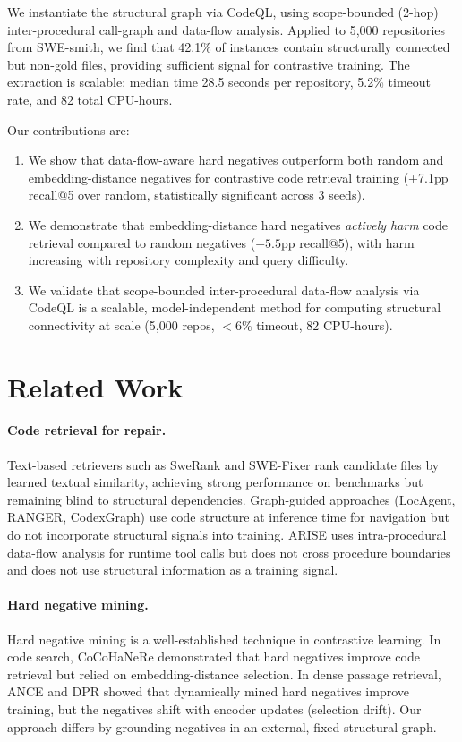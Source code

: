 \documentclass[11pt]{article}
\begin{document}
We instantiate the structural graph via CodeQL, using scope-bounded (2-hop) inter-procedural call-graph and data-flow analysis.
Applied to 5{,}000 repositories from SWE-smith, we find that 42.1\% of instances contain structurally connected but non-gold files, providing sufficient signal for contrastive training.
The extraction is scalable: median time 28.5 seconds per repository, 5.2\% timeout rate, and 82 total CPU-hours.

Our contributions are:
\begin{enumerate}[nosep]
  \item We show that data-flow-aware hard negatives outperform both random and embedding-distance negatives for contrastive code retrieval training (+7.1pp recall@5 over random, statistically significant across 3 seeds).
  \item We demonstrate that embedding-distance hard negatives \emph{actively harm} code retrieval compared to random negatives ($-5.5$pp recall@5), with harm increasing with repository complexity and query difficulty.
  \item We validate that scope-bounded inter-procedural data-flow analysis via CodeQL is a scalable, model-independent method for computing structural connectivity at scale (5{,}000 repos, $<6\%$ timeout, 82 CPU-hours).
\end{enumerate}

\section{Related Work}
\label{sec:related}

\paragraph{Code retrieval for repair.}
Text-based retrievers such as SweRank and SWE-Fixer rank candidate files by learned textual similarity, achieving strong performance on benchmarks but remaining blind to structural dependencies.
Graph-guided approaches (LocAgent, RANGER, CodexGraph) use code structure at inference time for navigation but do not incorporate structural signals into training.
ARISE uses intra-procedural data-flow analysis for runtime tool calls but does not cross procedure boundaries and does not use structural information as a training signal.

\paragraph{Hard negative mining.}
Hard negative mining is a well-established technique in contrastive learning.
In code search, CoCoHaNeRe demonstrated that hard negatives improve code retrieval but relied on embedding-distance selection.
In dense passage retrieval, ANCE and DPR showed that dynamically mined hard negatives improve training, but the negatives shift with encoder updates (selection drift).
Our approach differs by grounding negatives in an external, fixed structural graph.
\end{document}
